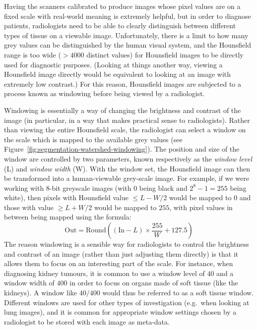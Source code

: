 Having the scanners calibrated to produce images whose pixel values are on a fixed scale with real-world meaning is extremely helpful, but in order to diagnose patients, radiologists need to be able to clearly distinguish between different types of tissue on a viewable image. Unfortunately, there is a limit to how many grey values can be distinguished by the human visual system, and the Hounsfield range is too wide ($> 4000$ distinct values) for Hounsfield images to be directly used for diagnostic purposes. (Looking at things another way, viewing a Hounsfield image directly would be equivalent to looking at an image with extremely low contrast.) For this reason, Hounsfield images are subjected to a process known as windowing before being viewed by a radiologist.


Windowing is essentially a way of changing the brightness and contrast of the image (in particular, in a way that makes practical sense to radiologists). Rather than viewing the entire Hounsfield scale, the radiologist can select a window on the scale which is mapped to the available grey values (see Figure~\ref{fig:segmentation-watershed-windowing}). The position and size of the window are controlled by two parameters, known respectively as the \emph{window level} (L) and \emph{window width} (W). With the window set, the Hounsfield image can then be transformed into a human-viewable grey-scale image. For example, if we were working with 8-bit greyscale images (with $0$ being black and $2^8 - 1 = 255$ being white), then pixels with Hounsfield value $\le L - W/2$ would be mapped to $0$ and those with value $\ge L + W/2$ would be mapped to $255$, with pixel values in between being mapped using the formula:
%
\[
\mbox{Out} = \mbox{Round}\left( (\mbox{In} - L) \times \frac{255}{W} + 127.5 \right)
\]
%
The reason windowing is a sensible way for radiologists to control the brightness and contrast of an image (rather than just adjusting them directly) is that it allows them to focus on an interesting part of the scale. For instance, when diagnosing kidney tumours, it is common to use a window level of $40$ and a window width of $400$ in order to focus on organs made of soft tissue (like the kidneys). A window like $40/400$ would thus be referred to as a soft tissue window. Different windows are used for other types of investigation (e.g.~when looking at lung images), and it is common for appropriate window settings chosen by a radiologist to be stored with each image as meta-data.

